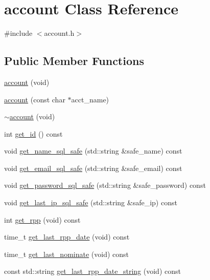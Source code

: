 \hypertarget{classaccount}{\section{account Class Reference}
\label{classaccount}
}


{\ttfamily \#include $<$account.\-h$>$}

\subsection*{Public Member Functions}
\begin{DoxyCompactItemize}
\item 
\hyperlink{classaccount_a86c420d904da93e17a0f079597ea3c18}{account} (void)
\item 
\hyperlink{classaccount_a7f9fc489391ffeeb0ac8b3edbd896852}{account} (const char $\ast$acct\-\_\-name)
\item 
\hyperlink{classaccount_aa6a7f7655faa4f0b1722d0b8dc45dd0e}{$\sim$account} (void)
\item 
int \hyperlink{classaccount_a0013a4b341ccb94d950b58dc9e40370c}{get\-\_\-id} () const 
\item 
void \hyperlink{classaccount_a55c4677963ad0cbad3df2ae17da15db0}{get\-\_\-name\-\_\-sql\-\_\-safe} (std\-::string \&safe\-\_\-name) const 
\item 
void \hyperlink{classaccount_a4aefad9867c8cb9393563f65c2956333}{get\-\_\-email\-\_\-sql\-\_\-safe} (std\-::string \&safe\-\_\-email) const 
\item 
void \hyperlink{classaccount_a2c96518fefa89811fe96c5778c300acd}{get\-\_\-password\-\_\-sql\-\_\-safe} (std\-::string \&safe\-\_\-password) const 
\item 
void \hyperlink{classaccount_a5693551c1a997ccf3b8ac3a627c2782d}{get\-\_\-last\-\_\-ip\-\_\-sql\-\_\-safe} (std\-::string \&safe\-\_\-ip) const 
\item 
int \hyperlink{classaccount_acd67b6a6eabbbe2e666f86ee74795a8f}{get\-\_\-rpp} (void) const 
\item 
time\-\_\-t \hyperlink{classaccount_a45f9b78f6ce59aa596d550cc6c68c15a}{get\-\_\-last\-\_\-rpp\-\_\-date} (void) const 
\item 
time\-\_\-t \hyperlink{classaccount_ac7207c93ae1ceb659166c113a0950907}{get\-\_\-last\-\_\-nominate} (void) const 
\item 
const std\-::string \hyperlink{classaccount_ae31cdc39d0e78b6e745b049f7557560d}{get\-\_\-last\-\_\-rpp\-\_\-date\-\_\-string} (void) const 
\item 

\end{DoxyCompactItemize}
